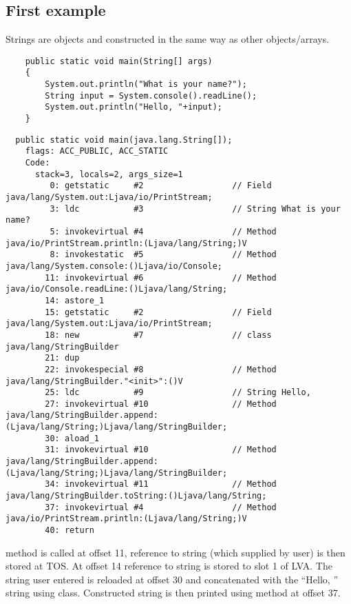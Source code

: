\subsection{First example}

Strings are objects and constructed in the same way as other objects/arrays.

\begin{lstlisting}
	public static void main(String[] args)
	{
		System.out.println("What is your name?");
		String input = System.console().readLine();
		System.out.println("Hello, "+input);
	}
\end{lstlisting}

\begin{lstlisting}
  public static void main(java.lang.String[]);
    flags: ACC_PUBLIC, ACC_STATIC
    Code:
      stack=3, locals=2, args_size=1
         0: getstatic     #2                  // Field java/lang/System.out:Ljava/io/PrintStream;
         3: ldc           #3                  // String What is your name?
         5: invokevirtual #4                  // Method java/io/PrintStream.println:(Ljava/lang/String;)V
         8: invokestatic  #5                  // Method java/lang/System.console:()Ljava/io/Console;
        11: invokevirtual #6                  // Method java/io/Console.readLine:()Ljava/lang/String;
        14: astore_1      
        15: getstatic     #2                  // Field java/lang/System.out:Ljava/io/PrintStream;
        18: new           #7                  // class java/lang/StringBuilder
        21: dup           
        22: invokespecial #8                  // Method java/lang/StringBuilder."<init>":()V
        25: ldc           #9                  // String Hello, 
        27: invokevirtual #10                 // Method java/lang/StringBuilder.append:(Ljava/lang/String;)Ljava/lang/StringBuilder;
        30: aload_1       
        31: invokevirtual #10                 // Method java/lang/StringBuilder.append:(Ljava/lang/String;)Ljava/lang/StringBuilder;
        34: invokevirtual #11                 // Method java/lang/StringBuilder.toString:()Ljava/lang/String;
        37: invokevirtual #4                  // Method java/io/PrintStream.println:(Ljava/lang/String;)V
        40: return        
\end{lstlisting}

 method is called at offset 11, reference to string (which supplied by user) 
is then stored at \ac{TOS}.
At offset 14 reference to string is stored to slot 1 of \ac{LVA}.
The string user entered is reloaded at offset 30 and concatenated with the ``Hello, '' string 
using  class.
Constructed string is then printed using  method at offset 37.
